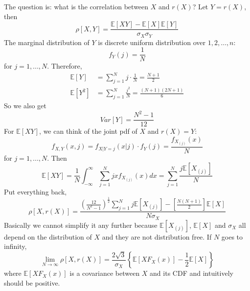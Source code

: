 \documentclass[twoside]{article}
\begin{document}
The question is: what is the correlation between $X$ and $r(X)$? Let $Y = r(X)$, then
$$
\rho \left[ X, Y \right] = \frac{\mathbb{E} [XY] - \mathbb{E} [X] \mathbb{E} [Y]}{\sigma_X \sigma_Y}
$$
The marginal distribution of $Y$ is  discrete uniform distribution over ${1, 2, \dots, n}$: 
$$
f_Y(j) = \frac{1}{N}
$$
for $j = 1, ..., N$. Therefore, 
\begin{align*}
	\mathbb{E} \left[ Y \right] &= \sum_{j=1}^N j \cdot \frac{1}{N} = \frac{N+1}{2} \\
	\mathbb{E} \left[ Y^2 \right] &= \sum_{j=1}^N \frac{j^2}{N} = \frac{(N+1)(2N+1)}{6}
\end{align*}
So we also get
$$
Var \left[ Y \right] = \frac{N^2 - 1}{12}
$$
For $\mathbb{E} \left[ XY \right]$, we can think of the joint pdf of $X$ and $r(X) = Y$: 
$$
f_{X,Y} (x, j) = f_{X | Y = j} (x|j) \cdot f_{Y} (j) = \frac{f_{X_{(j)}} (x)}{N}
$$
for $j = 1,...,N$. Then
$$
\mathbb{E} \left[ XY \right] = \frac{1}{N} \int_{- \infty}^{\infty} \sum_{j=1}^N j x f_{X_{(j)}}(x) dx = \sum_{j=1}^{N} \frac{j \mathbb{E} \left[ X_{(j)} \right]}{N}
$$
Put everything back, 
$$
\rho \left[ X, r(X) \right] = \frac{\left( \frac{12}{N^2 - 1} \right)^{\frac{1}{2}} \sum_{j=1}^{N} j \mathbb{E} \left[ X_{(j)} \right] - \left[ \frac{N(N+1)}{2} \right] \mathbb{E} \left[ X \right]}{N \sigma_X}
$$
Basically we cannot simplify it any further because $\mathbb{E} \left[ X_{(j)} \right]$, $\mathbb{E} \left[ X \right]$ and $\sigma_X$ all depend on the distribution of $X$ and they are not distribution free. If $N$ goes to infinity, 
$$
\lim_{N \to \infty} \rho \left[ X, r(X) \right] = \frac{2 \sqrt{3}}{\sigma_X} \left\{ \mathbb{E} \left[ X F_X(x) \right] - \frac{1}{2} \mathbb{E} \left[ X \right] \right\}
$$
where $\mathbb{E}[X F_X(x)]$ is a covariance between $X$ and its CDF and intuitively should be positive. 
\end{document}
